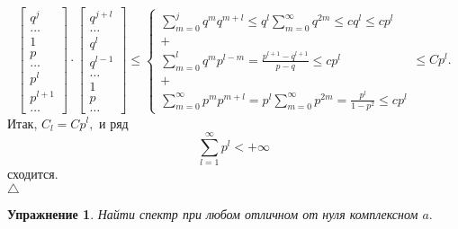 \documentclass[12pt,a4paper]{article}
\theoremstyle{plain}   \newtheorem{Pro}{Задача}
\newtheorem{Exe}{Упражнение}
\begin{document}
\begin{equation*}
  \begin{bmatrix}
    q^j \\
	\dots \\
	1 \\
	p \\
	\dots \\
	p^l \\
	p^{l+1} \\
	\dots
  \end{bmatrix}
    \cdot
  \begin{bmatrix}
    q^{j+l} \\
	\dots \\
	q^l \\
	q^{l-1} \\
	\dots \\
	1 \\
	p \\
	\dots
  \end{bmatrix}
    \leq
  \begin{cases}
    \sum _{m=0}^j q^m q^{m+l} \leq
	q^l \sum_{m=0}^{\infty} q^{2m} \leq
	c q^l \leq cp^l \\
	+ \\
	 \sum _{m=0}^l q^m p^{l-m} =
	\frac{p^{l+1}-q^{l+1}}{p-q}
	\leq cp^l \\
	+ \\
	 \sum_{m=0}^{\infty} p^m p^{m+l} =
	p^l \sum_{m=0}^{\infty} p^{2m} =
	\frac{p^l}{1-p^2} \leq cp^l
  \end{cases}
    \leq Cp^l .
\end{equation*}
Итак,
$ C_l =Cp^l , $
и ряд
$$
  \sum_{l=1}^{\infty} p^l < +\infty
$$
сходится.
\\
$ \triangle $
\begin{Exe}
Найти спектр при любом отличном от нуля комплексном
$ a . $
\end{Exe}
\newpage
\end{document}
